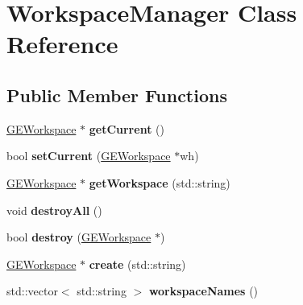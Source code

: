 \hypertarget{class_workspace_manager}{\section{Workspace\-Manager Class Reference}
\label{class_workspace_manager}
}
\subsection*{Public Member Functions}
\begin{DoxyCompactItemize}
\item 
\hypertarget{class_workspace_manager_a34b0724020ffa4507ae8a94288133470}{\hyperlink{class_g_e_workspace}{G\-E\-Workspace} $\ast$ {\bfseries get\-Current} ()}\label{class_workspace_manager_a34b0724020ffa4507ae8a94288133470}

\item 
\hypertarget{class_workspace_manager_a1aee8705de2d071b6cce59dc83081ff6}{bool {\bfseries set\-Current} (\hyperlink{class_g_e_workspace}{G\-E\-Workspace} $\ast$wh)}\label{class_workspace_manager_a1aee8705de2d071b6cce59dc83081ff6}

\item 
\hypertarget{class_workspace_manager_a8cdce80ccee12bfa35ede4fcbcd690e3}{\hyperlink{class_g_e_workspace}{G\-E\-Workspace} $\ast$ {\bfseries get\-Workspace} (std\-::string)}\label{class_workspace_manager_a8cdce80ccee12bfa35ede4fcbcd690e3}

\item 
\hypertarget{class_workspace_manager_a5a50cb8c0943409770b0e99ce43cd4d3}{void {\bfseries destroy\-All} ()}\label{class_workspace_manager_a5a50cb8c0943409770b0e99ce43cd4d3}

\item 
\hypertarget{class_workspace_manager_a3d94a98f51e2ff65c32b39aba1493854}{bool {\bfseries destroy} (\hyperlink{class_g_e_workspace}{G\-E\-Workspace} $\ast$)}\label{class_workspace_manager_a3d94a98f51e2ff65c32b39aba1493854}

\item 
\hypertarget{class_workspace_manager_a14e75f3184b94c1acb6304fd80fd489f}{\hyperlink{class_g_e_workspace}{G\-E\-Workspace} $\ast$ {\bfseries create} (std\-::string)}\label{class_workspace_manager_a14e75f3184b94c1acb6304fd80fd489f}

\item 
\hypertarget{class_workspace_manager_a3cdec90aca5367e8220db48e574d23c4}{std\-::vector$<$ std\-::string $>$ {\bfseries workspace\-Names} ()}\label{class_workspace_manager_a3cdec90aca5367e8220db48e574d23c4}


\end{DoxyCompactItemize}
